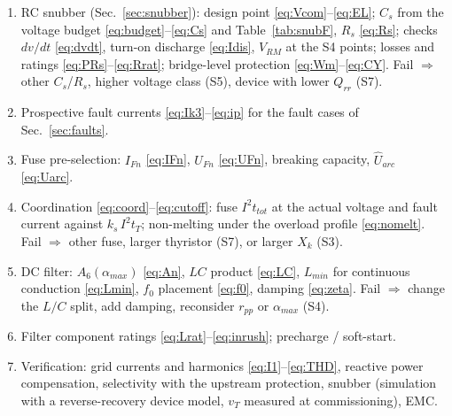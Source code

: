 \documentclass[10pt,a4paper]{scrartcl}
\newcommand{\Xk}{X_{k}}
\newcommand{\iit}{I^{2}t}
\begin{document}
\begin{enumerate}[label=\textbf{S\arabic*},leftmargin=*]
\item RC snubber (Sec.~\ref{sec:snubber}): design point \eqref{eq:Vcom}--\eqref{eq:EL}; $C_s$ from the voltage budget \eqref{eq:budget}--\eqref{eq:Cs} and Table~\ref{tab:snubF}, $R_s$ \eqref{eq:Rs}; checks $dv/dt$ \eqref{eq:dvdt}, turn-on discharge \eqref{eq:Idis}, $V_{RM}$ at the S4 points; losses and ratings \eqref{eq:PRs}--\eqref{eq:Rrat}; bridge-level protection \eqref{eq:Wm}--\eqref{eq:CY}. Fail $\Rightarrow$ other $C_s$/$R_s$, higher voltage class (S5), device with lower $Q_{rr}$ (S7).
\item Prospective fault currents \eqref{eq:Ik3}--\eqref{eq:ip} for the fault cases of Sec.~\ref{sec:faults}.
\item Fuse pre-selection: $I_{Fn}$ \eqref{eq:IFn}, $U_{Fn}$ \eqref{eq:UFn}, breaking capacity, $\hat U_{arc}$ \eqref{eq:Uarc}.
\item Coordination \eqref{eq:coord}--\eqref{eq:cutoff}: fuse $\iit_{tot}$ at the actual voltage and fault current against $k_s\,\iit_T$; non-melting under the overload profile \eqref{eq:nomelt}. Fail $\Rightarrow$ other fuse, larger thyristor (S7), or larger $\Xk$ (S3).
\item DC filter: $A_6(\alpha_{max})$ \eqref{eq:An}, $LC$ product \eqref{eq:LC}, $L_{min}$ for continuous conduction \eqref{eq:Lmin}, $f_0$ placement \eqref{eq:f0}, damping \eqref{eq:zeta}. Fail $\Rightarrow$ change the $L/C$ split, add damping, reconsider $r_{pp}$ or $\alpha_{max}$ (S4).
\item Filter component ratings \eqref{eq:Lrat}--\eqref{eq:inrush}; precharge / soft-start.
\item Verification: grid currents and harmonics \eqref{eq:I1}--\eqref{eq:THD}, reactive power compensation, selectivity with the upstream protection, snubber (simulation with a reverse-recovery device model, $v_T$ measured at commissioning), EMC.
\end{enumerate}
\end{document}
